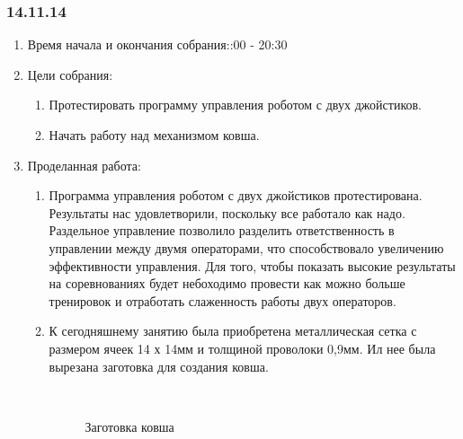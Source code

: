 
\subsubsection{14.11.14}

\begin{enumerate} 
	\item Время начала и окончания собрания::00 - 20:30
	\item Цели собрания:
	\begin{enumerate}
		\item Протестировать программу управления роботом с двух джойстиков.
		
		\item Начать работу над механизмом ковша.
		
	\end{enumerate}
	
	\item Проделанная работа:
	\begin{enumerate}
		\item Программа управления роботом с двух джойстиков протестирована. Результаты нас удовлетворили, поскольку все работало как надо. Раздельное управление позволило разделить ответственность в управлении между двумя операторами, что способствовало увеличению эффективности управления. Для того, чтобы показать высокие результаты на соревнованиях будет небоходимо провести как можно больше тренировок и отработать слаженность работы двух операторов.
		
		\item К сегодняшнему занятию была приобретена металлическая сетка с размером ячеек 14 х 14мм и толщиной проволоки 0,9мм. Ил нее была вырезана заготовка для создания ковша.
		
	    \begin{figure}[H]
			\begin{minipage}[h]{0.2\linewidth}
				\center  
			\end{minipage}
			\begin{minipage}[h]{0.6\linewidth}
				\caption{Заготовка ковша}
			\end{minipage}
		\end{figure}
		

\end{enumerate}
\end{enumerate}
